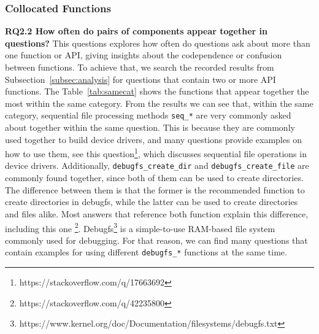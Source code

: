 \subsubsection{Collocated Functions}
\textbf{RQ2.2 How often do pairs of components appear together in questions?}
This questions explores how often do questions ask about more than one function or API, giving insights about the codependence or confusion between functions. To achieve that, we search the recorded results from Subsection~\ref{subsec:analysis} for questions that contain two or more API functions. The Table~\ref{tab:samecat} shows the functions that appear together the most within the same category. From the results we can see that, within the same category, sequential file processing methods \texttt{seq\_*} are very commonly asked about together within the same question. This is because they are commonly used together to build device drivers, and many questions provide examples on how to use them, see this question\footnote{https://stackoverflow.com/q/17663692}, which discusses sequential file operations in device drivers.
Additionally, \texttt{debugfs\_create\_dir} and \texttt{debugfs\_create\_file} are commonly found together, since both of them can be used to create directories. The difference between them is that the former is the recommended function to create directories in debugfs, while the latter can be used to create directories and files alike. Most answers that reference both function explain this difference, including this one \footnote{https://stackoverflow.com/q/42235800}.
Debugfs\footnote{https://www.kernel.org/doc/Documentation/filesystems/debugfs.txt} is a simple-to-use RAM-based file system commonly used for debugging. For that reason, we can find many questions that contain examples for using different \texttt{debugfs\_*} functions at the same time.


